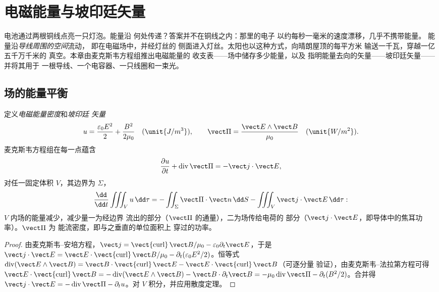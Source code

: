 \chapter{电磁能量与坡印廷矢量}\label{ch:b2:poynting-vector}

电池通过两根铜线点亮一只灯泡。能量沿
何处传递？答案并不在铜线之内：那里的电子
以约每秒一毫米的速度漂移，几乎不携带能量。
能量沿\emph{导线周围的空间}流动，
即在电磁场中，并经灯丝的
侧面进入灯丝。太阳也以这种方式，向晴朗屋顶的每平方米
输送一千瓦，穿越一亿五千万千米的
真空。本章由麦克斯韦方程组推出电磁能量的
收支表——场中储存多少能量，以及
指明能量去向的矢量——坡印廷矢量——并将其用于
一根导线、一个电容器、一只线圈和一束光。

\section{场的能量平衡}

\begin{theorem}[坡印廷定理]\label{thm:b2:poynting-vector:poynting}
定义\emph{电磁能量密度}和\emph{坡印廷
矢量}
\[
u = \frac{\varepsilon_0E^2}2 + \frac{B^2}{2\mu_0} \quad (\unit{J/m^3}) , \qquad
\vect\Pi = \frac{\vect E\wedge\vect B}{\mu_0} \quad (\unit{W/m^2}) .
\]
麦克斯韦方程组在每一点蕴含
\[
\frac{\partial u}{\partial t} + \operatorname{div}\vect\Pi = -\vect j\cdot\vect E ,
\]
对任一固定体积 $V$，其边界为 $\Sigma$，
\[
\frac{\dd}{\dd t}\iiint_Vu\,\dd\tau = -\iint_\Sigma\vect\Pi\cdot\vect n\,\dd S - \iiint_V\vect j\cdot\vect E\,\dd\tau :
\]
$V$ 内场的能量减少，减少量一为经边界
流出的部分（$\vect\Pi$ 的通量），二为场传给电荷的
部分（$\vect j\cdot\vect E$，即导体中的焦耳功率）。$\vect\Pi$ 为
能流密度，即与之垂直的单位面积上
穿过的功率。
\end{theorem}

\begin{proof}
由麦克斯韦–安培方程，$\vect j = \operatorname{\vect{curl}}\vect B/\mu_0 - \varepsilon_0\partial_t
\vect E$，于是 $\vect j\cdot\vect E = \vect E\cdot\operatorname{\vect{curl}}\vect B/\mu_0 -
\partial_t(\varepsilon_0E^2/2)$。恒等式 $\operatorname{div}(\vect E\wedge\vect B) = \vect B
\cdot\operatorname{\vect{curl}}\vect E - \vect E\cdot\operatorname{\vect{curl}}\vect B$（可逐分量
验证），由麦克斯韦–法拉第方程可得 $\vect E\cdot\operatorname{\vect{curl}}
\vect B = -\operatorname{div}(\vect E\wedge\vect B) - \vect B\cdot\partial_t\vect B = -\mu_0
\operatorname{div}\vect\Pi - \partial_t(B^2/2)$。合并得 $\vect j\cdot\vect E = -\operatorname{div}
\vect\Pi - \partial_tu$。对 $V$ 积分，并应用散度定理。
\end{proof}

